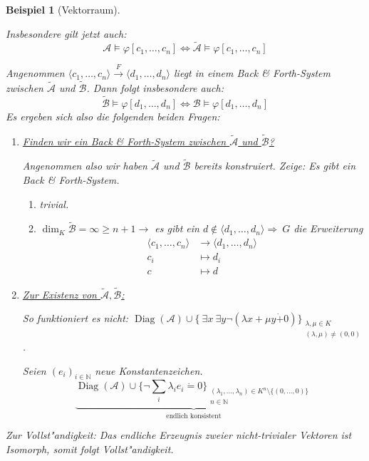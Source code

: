 \documentclass[a4paper,12pt,numbers=noenddot,parskip=full]{scrartcl}
\newcommand{\setN}{\mathbb{N}}
\newcommand{\Exists}{~\exists}
\newcommand{\scrA}{\mathcal{A}}
\newcommand{\scrB}{\mathcal{B}}
\DeclareMathOperator{\Diag}{Diag}
\newcommand{\vdig}{\Diag}
\theoremstyle{dotless}
\newtheorem{example}[theorem]{Beispiel}
\theoremstyle{remark}
\begin{document}
\begin{example}[Vektorraum]
\begin{enumerate}
		Insbesondere gilt jetzt auch: 
		\begin{equation*}
			\scrA \models \varphi[c_1, \dots, c_n] \Leftrightarrow \tilde{\scrA} \models \varphi[c_1, \dots, c_n]
		\end{equation*}
		
		Angenommen $\langle c_1, \dots, c_n \rangle \overset{F}{\longrightarrow} \langle d_1, \dots, d_n \rangle$ liegt in einem Back \& Forth-System zwischen $\tilde{\scrA}$ und $\tilde{\scrB}$. Dann folgt insbesondere auch:
		\begin{equation*}
			\tilde{\scrB} \models \varphi[d_1, \dots, d_n] \Leftrightarrow \scrB \models \varphi[d_1, \dots, d_n]
		\end{equation*}
		Es ergeben sich also die folgenden beiden Fragen:
		\begin{enumerate}
			\item \underline{Finden wir ein Back \& Forth-System zwischen $\tilde{\scrA}$ und $\tilde{\scrB}$?} 
			
			Angenommen also wir haben $\tilde{\scrA}$ und $\tilde{\scrB}$ bereits konstruiert. Zeige: Es gibt ein Back \& Forth-System.
			\begin{enumerate}
				\item[$c \in$ UR:] trivial.
				\item[$c \notin$ UR:] $\dim_K \tilde{\scrB} = \infty \geq n+1 \longrightarrow$ es gibt ein $d \notin \langle d_1, \dots, d_n \rangle \Rightarrow~G$ die Erweiterung \begin{align*}
					\langle c_1, \dots, c_n \rangle &\longrightarrow \langle d_1, \dots, d_n \rangle\\c_i &\longmapsto d_i\\c &\longmapsto d
				\end{align*}
			\end{enumerate}
		
			\item \underline{Zur Existenz von $\tilde{\scrA}, \tilde{\scrB}$:}
			
			So funktioniert es nicht: $\vdig(\scrA) \cup \{\Exists x \Exists y \lnot (\lambda x + \mu y \dot{+} 0)\}_{\substack{\lambda, \mu \in K\\(\lambda, \mu) \neq (0,0)}}$.
			
			Seien $(e_i)_{i \in \setN}$ neue Konstantenzeichen.
			\begin{equation*}
				\underbrace{\vdig(\scrA) \cup \{\lnot \sum_i \lambda_i e_i \dot=0\}_{\substack{(\lambda_1, \dots, \lambda_n) \in K^n \setminus \{(0, \dots, 0) \}\\n \in \setN}}}_\text{endlich konsistent}
			\end{equation*}
		\end{enumerate}
		Zur Vollst"andigkeit: Das endliche Erzeugnis zweier nicht-trivialer Vektoren ist Isomorph, somit folgt Vollst"andigkeit.
	\end{enumerate}
\end{example}
\end{document}
